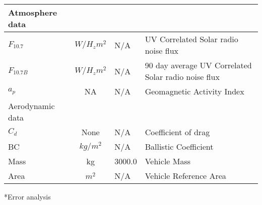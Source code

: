 \begin{table}[htb]
\begin{center}
{\begin{tabular}{|l|c|l|l|}
Atmosphere data   &            &          &      \\ \hline \hline
$F_{10.7}$        & $W/{H_z}{m^2}$    &   N/A    & UV Correlated Solar radio noise flux             \\ \hline
$F_{10.7B}$       & $W/{H_z}{m^2}$    &   N/A    &  90 day average UV Correlated Solar radio noise flux  \\ \hline
$a_p$            &  NA                &   N/A    &  Geomagnetic Activity Index                \\ \hline \hline
Aerodynamic data         &      &      &      \\ \hline \hline
$C_d$                    &None       &  N/A         & Coefficient of drag \\ \hline
BC                       &$kg/m^2$   &  N/A          & Ballistic Coefficient \\ \hline
Mass                     &kg         &  3000.0            & Vehicle Mass           \\ \hline
Area                     &$m^2$      &  N/A             & Vehicle Reference Area  \\ \hline
\end{tabular}}
\end{center}
\end{table}
*Error analysis \cite{JPL}
\clearpage
